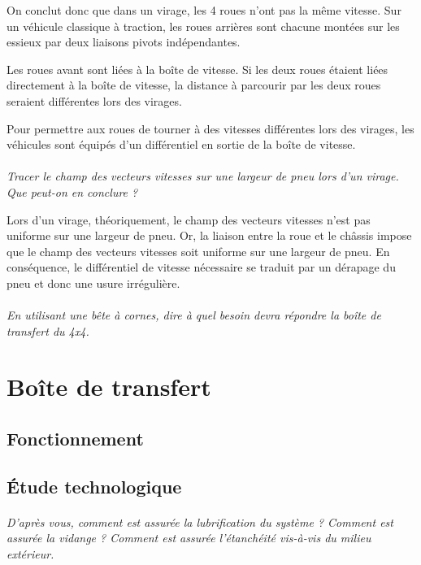 \documentclass[11pt,oneside]{article}
\begin{document}
On conclut donc que dans un virage, les 4 roues n'ont pas la même vitesse. Sur un véhicule classique à traction, les roues arrières sont chacune montées sur les essieux par deux liaisons pivots indépendantes. 

Les roues avant sont liées à la boîte de vitesse. Si les deux roues étaient liées directement à la boîte de vitesse, la distance à parcourir par les deux roues seraient différentes lors des virages. 

Pour permettre aux roues de tourner à des vitesses différentes lors des virages, les véhicules sont équipés d'un différentiel en sortie de la boîte de vitesse. 

\paragraph{}
\textit{Tracer le champ des vecteurs vitesses sur une largeur de pneu lors d'un virage. Que peut-on en conclure ?}

Lors d'un virage, théoriquement, le champ des vecteurs vitesses n'est pas uniforme sur une largeur de pneu. Or, la liaison entre la roue et le châssis impose que le champ des vecteurs vitesses soit uniforme sur une largeur de pneu. En conséquence, le différentiel de vitesse nécessaire se traduit par un dérapage du pneu et donc une usure irrégulière.

\paragraph{}
\textit{En utilisant une bête à cornes, dire à quel besoin devra répondre la boîte de transfert du 4x4.}


\section{Boîte de transfert}

\subsection{Fonctionnement}

\subsection{Étude technologique}

\paragraph{}
\textit{D'après vous, comment est assurée la lubrification du système ? Comment est assurée la vidange ? Comment est assurée l'étanchéité vis-à-vis du milieu extérieur. }
\end{document}

